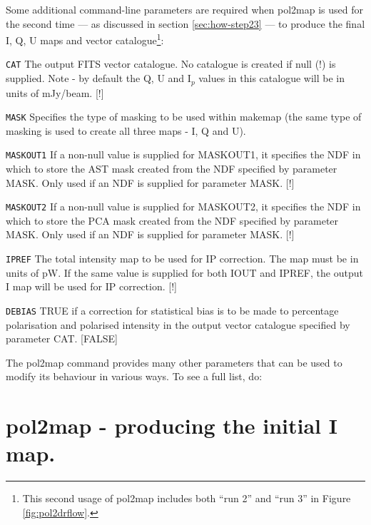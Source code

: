 Some additional command-line parameters are required when pol2map is
used for the second time --- as discussed in section \ref{sec:how-step23}
--- to produce the final I, Q, U maps and vector catalogue\footnote{This
second usage of pol2map includes both ``run 2'' and ``run 3'' in Figure
\ref{fig:pol2drflow}.}:

\begin{aligndesc}

\item[\texttt{CAT}] The output FITS vector catalogue. No catalogue is
  created if null (!) is supplied. Note - by default the Q, U and
  I$_{p}$ values in this catalogue will be in units of mJy/beam. [!]


\item[\texttt{MASK}] Specifies the type of masking to be used within
  makemap (the same type of masking is used to create all three maps -
  I, Q and U).


\item[\texttt{MASKOUT1}] If a non-null value is supplied for MASKOUT1,
  it specifies the NDF in which to store the AST mask created from the
  NDF specified by parameter MASK. Only used if an NDF is supplied for
  parameter MASK. [!]


\item[\texttt{MASKOUT2}] If a non-null value is supplied for MASKOUT2,
  it specifies the NDF in which to store the PCA mask created from the
  NDF specified by parameter MASK. Only used if an NDF is supplied for
  parameter MASK. [!]


\item[\texttt{IPREF}] The total intensity map to be used for IP
  correction. The map must be in units of pW. If the same value is
  supplied for both IOUT and IPREF, the output I map will be used for
  IP correction. [!]

\item[\texttt{DEBIAS}] TRUE if a correction for statistical bias is to
  be made to percentage polarisation and polarised intensity in the
  output vector catalogue specified by parameter CAT. [FALSE]
\end{aligndesc}

The pol2map command provides many other parameters that can be used to
modify its behaviour in various ways. To see a full list, do:

\begin{terminalv}
\end{terminalv}


\section{pol2map - producing the initial I map.}
\label{sec:how-step1}

